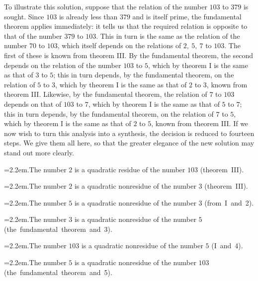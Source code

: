 To illustrate this solution, suppose that the relation of the number $103$ to $379$ is sought. Since $103$ is already less than $379$ and is itself prime, the fundamental theorem applies immediately: it tells us that the required relation is opposite to that of the number $379$ to $103$. This in turn is the same as the relation of the number $70$ to $103$, which itself depends on the relations of $2,\ 5,\ 7$ to $103$. The first of these is known from theorem III. By the fundamental theorem, the second depends on the relation of the number $103$ to $5$, which by theorem I is the same as that of $3$ to $5$; this in turn depends, by the fundamental theorem, on the relation of $5$ to $3$, which by theorem I is the same as that of $2$ to $3$, known from theorem III. Likewise, by the fundamental theorem, the relation of $7$ to $103$ depends on that of $103$ to $7$, which by theorem I is the same as that of $5$ to $7$; this in turn depends, by the fundamental theorem, on the relation of $7$ to $5$, which by theorem I is the same as that of $2$ to $5$, known from theorem III. If we now wish to turn this analysis into a synthesis, the decision is reduced to fourteen steps. We give them all here, so that the greater elegance of the new solution may stand out more clearly.

{\raggedright\hangindent=2.2em.\quad The number $2$ is a quadratic residue of the number $103$ \mbox{(theorem III)}.\par}

{\raggedright\hangindent=2.2em.\quad The number $2$ is a quadratic nonresidue of the number $3$ \mbox{(theorem III)}.\par}

{\raggedright\hangindent=2.2em.\quad The number $5$ is a quadratic nonresidue of the number $3$ \mbox{(from I and 2)}.\par}

{\raggedright\hangindent=2.2em.\quad The number $3$ is a quadratic nonresidue of the number $5$ \mbox{(the fundamental theorem and 3)}.\par}

{\raggedright\hangindent=2.2em.\quad The number $103$ is a quadratic nonresidue of the number $5$ \mbox{(I and 4)}.\par}

%
{\raggedright\hangindent=2.2em.\quad The number $5$ is a quadratic nonresidue of the number $103$ \mbox{(the fundamental theorem and 5)}.\par}

